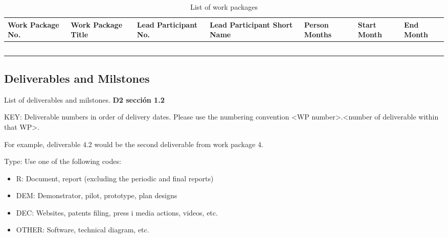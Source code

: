 \begin{longtable}[H]{p{1.3cm} p{2cm} p{1.8cm} p{2cm} p{1.9cm} p{1.6cm} p{1.4cm}}
	\toprule[2pt]
	
	\textbf{Work Package No.} & \textbf{Work Package Title} & \textbf{Lead Participant No.} & \textbf{Lead Participant Short Name} & \textbf{Person Months} & \textbf{Start Month} & \textbf{End Month} \\
	
	\midrule[1.5pt] 
	\endhead
	
	 &  &  &  &  &  & \vspace{0.2cm} \\
	
	\midrule

	 &  &  &  &  &  & \vspace{0.2cm} \\
	
	\midrule
	
	 &  &  &  &  &  &  \vspace{0.2cm} \\

	\midrule

 	 &  &  &  &  &  &  \vspace{0.2cm} \\
	
	\bottomrule[2pt]
	
	\caption{List of work packages}
	\label{workpackages}
\end{longtable}


\subsection{Deliverables and Milstones}

List of deliverables and milstones. \textbf{D2 sección 1.2}

KEY: Deliverable numbers in order of delivery dates. Please use the numbering convention <WP number>.<number of deliverable within that WP>.

For example, deliverable 4.2 would be the second deliverable from work package 4.

Type: Use one of the following codes:
\begin{itemize}
\item R: Document, report (excluding the periodic and final reports) 
\item DEM: Demonstrator, pilot, prototype, plan designs
\item DEC: Websites, patents filing, press i media actions, videos, etc. 
\item OTHER: Software, technical diagram, etc.
\end{itemize}

